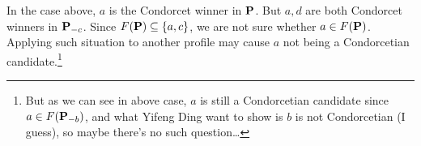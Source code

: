\begin{center}
\end{center}

In the case above, $a$ is the Condorcet winner in $\mathbf{P}$. But $a,d$ are both Condorcet winners in $\mathbf{P}_{-c}$. Since $F(\mathbf{P}) \subseteq \{a,c\}$, we are not sure whether $a \in F(\mathbf{P})$. Applying such situation to another profile may cause $a$ not being a Condorcetian candidate.\footnote{But as we can see in above case, $a$ is still a Condorcetian candidate since $a \in F(\mathbf{P}_{-b})$, and what Yifeng Ding want to show is $b$ is not Condorcetian (I guess), so maybe there's no such question\dots}
